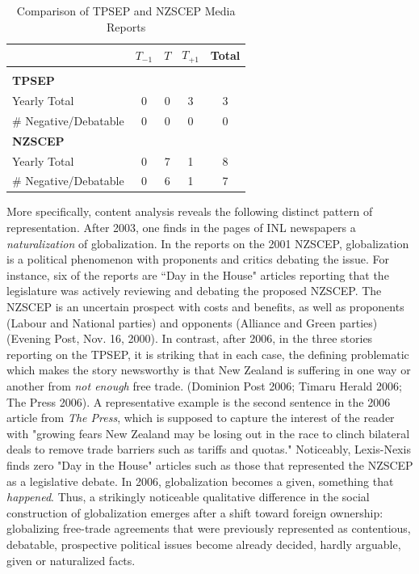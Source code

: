 \documentclass[12pt]{report}
\begin{document}
\begin{center}
\begin{table}[htdp]
\caption{Comparison of TPSEP and NZSCEP Media Reports}
\begin{center}
{\footnotesize
\begin{tabular}{lcccc} \hline & $T_{-1}$ &  $T$ &  $T_{+1}$ &
Total \\ \hline &  &  &
 \\ \bf{TPSEP} & & & &\\ Yearly Total & 0 & 0 & 3 & 3\\ \#
Negative/Debatable & 0 & 0 & 0 & 0  \\ \bf{NZSCEP} & & & & \\ Yearly Total & 0 & 7 & 1 &
8\\ \# Negative/Debatable & 0 & 6 & 1 & 7 \vspace{10pt}\\
\end{tabular}
}
\end{center}
\label{default}
\end{table}
\end{center}


More specifically, content analysis reveals the following distinct pattern of representation. After
2003, one finds in the pages of INL newspapers a \emph{naturalization} of globalization. In the
reports on the 2001 NZSCEP, globalization is a political phenomenon with proponents and critics
debating the issue. For instance, six of the reports are ``Day in the House" articles reporting that
the legislature was actively reviewing and debating the proposed NZSCEP. The NZSCEP is an uncertain
prospect with costs and benefits, as well as proponents (Labour and National parties) and opponents
(Alliance and Green parties) (Evening Post, Nov. 16, 2000). In contrast, after 2006, in the three
stories reporting on the TPSEP, it is striking that in each case, the defining problematic which
makes the story newsworthy is that New Zealand is suffering in one way or another from \emph{not
enough} free trade. (Dominion Post 2006; Timaru Herald 2006; The Press 2006). A representative
example is the second sentence in the 2006 article from \emph{The Press}, which is supposed to
capture the interest of the reader with "growing fears New Zealand may be losing out in the race to
clinch bilateral deals to remove trade barriers such as tariffs and quotas." Noticeably, Lexis-Nexis
finds zero "Day in the House" articles such as those that represented the NZSCEP as a legislative
debate. In 2006, globalization becomes a given, something that \emph{happened}. Thus, a strikingly
noticeable qualitative difference in the social construction of globalization emerges after a shift
toward foreign ownership: globalizing free-trade agreements that were previously represented as
contentious, debatable, prospective political issues become already decided, hardly arguable, given
or naturalized facts.
\end{document}
